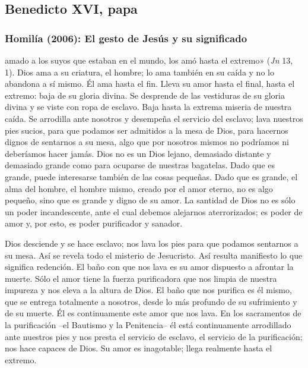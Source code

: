 \newsection
\subsection{Benedicto XVI, papa}

\subsubsection{Homilía (2006): El gesto de Jesús y su significado}


\begin{body}
 amado a los suyos que estaban en el mundo, los amó hasta el extremo» (\textit{Jn} 13, 1). Dios ama a su criatura, el hombre; lo ama también en su caída y no lo abandona a sí mismo. Él ama hasta el fin. Lleva su amor hasta el final, hasta el extremo: baja de su gloria divina. Se desprende de las vestiduras de su gloria divina y se viste con ropa de esclavo. Baja hasta la extrema miseria de nuestra caída. Se arrodilla ante nosotros y desempeña el servicio del esclavo; lava nuestros pies sucios, para que podamos ser admitidos a la mesa de Dios, para hacernos dignos de sentarnos a su mesa, algo que por nosotros mismos no podríamos ni deberíamos hacer jamás. Dios no es un Dios lejano, demasiado distante y demasiado grande como para ocuparse de nuestras bagatelas. Dado que es grande, puede interesarse también de las cosas pequeñas. Dado que es grande, el alma del hombre, el hombre mismo, creado por el amor eterno, no es algo pequeño, sino que es grande y digno de su amor. La santidad de Dios no es sólo un poder incandescente, ante el cual debemos alejarnos aterrorizados; es poder de amor y, por esto, es poder purificador y sanador.

Dios desciende y se hace esclavo; nos lava los pies para que podamos sentarnos a su mesa. Así se revela todo el misterio de Jesucristo. Así resulta manifiesto lo que significa redención. El baño con que nos lava es su amor dispuesto a afrontar la muerte. Sólo el amor tiene la fuerza purificadora que nos limpia de nuestra impureza y nos eleva a la altura de Dios. El baño que nos purifica es él mismo, que se entrega totalmente a nosotros, desde lo más profundo de su sufrimiento y de su muerte. Él es continuamente este amor que nos lava. En los sacramentos de la purificación –el Bautismo y la Penitencia– él está continuamente arrodillado ante nuestros pies y nos presta el servicio de esclavo, el servicio de la purificación; nos hace capaces de Dios. Su amor es inagotable; llega realmente hasta el extremo.


\end{body}
